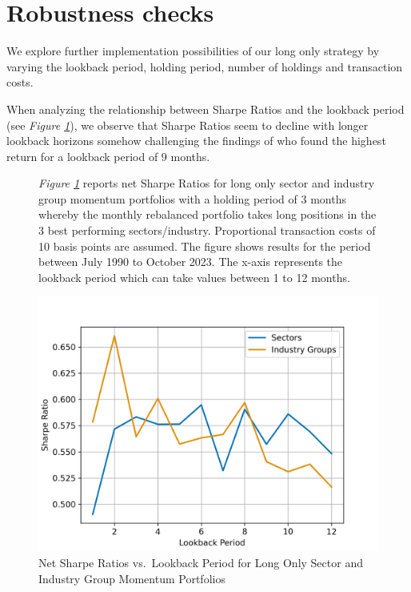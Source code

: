 \documentclass[a4paper,12pt,twoside]{article}
\begin{document}
\newpage
\section{Robustness checks}
We explore further implementation possibilities of our long only strategy by varying the lookback period, holding period, number of holdings and transaction costs. 

When analyzing the relationship between Sharpe Ratios and the lookback period (see \textit{Figure \ref{fig_06}}), we observe that Sharpe Ratios seem to decline with longer lookback horizons somehow challenging the findings of \cite{jegadeesh1993returns} who found the highest return for a lookback period of 9 months. 

\begin{figure}[H]
        \captionsetup{justification=centering}
   \caption{Net Sharpe Ratios vs.~Lookback Period for Long Only Sector and Industry Group Momentum Portfolios}
    \label{fig_06}
        \textit{Figure \ref{fig_06}} reports net Sharpe Ratios for long only sector and industry group momentum portfolios with a holding period of 3 months whereby the monthly rebalanced portfolio takes long positions in the 3 best performing sectors/industry. Proportional transaction costs of 10 basis points are assumed. The figure shows results for the period between July 1990 to October 2023. The x-axis represents the lookback period which can take values between 1 to 12 months.
    \centerline{\includegraphics[width=1\textwidth]{Plots/robustness_check_lookback.png}}
\end{figure}
\end{document}
